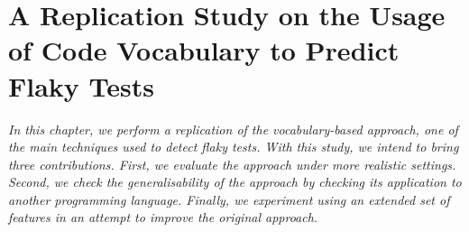 \chapter{A Replication Study on the Usage of Code Vocabulary to Predict Flaky Tests}
\label{chap:replication}

\setcounter{minitocdepth}{1}
\justifying
\textit{
In this chapter, we perform a replication of the vocabulary-based approach, one of the main techniques used to detect flaky tests. With this study, we intend to bring three contributions. First, we evaluate the approach under more realistic settings. Second, we check the generalisability of the approach by checking its application to another programming language. Finally, we experiment using an extended set of features in an attempt to improve the original approach.} \\







